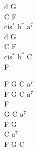 \begin{chord}
    d G\\
    C F\\
    $\mathrm{cis^*}$ $\mathrm{h^*}$ $\mathrm{a^7}$\\
    d G\\
    C F\\
    $\mathrm{cis^*}$ $\mathrm{h^*}$ C\\
    F

    F G C $\mathrm{a^7}$\\
    F G C $\mathrm{a^7}$\\
    F\\
    G C $\mathrm{a^7}$\\
    F G\\
    C $\mathrm{a^7}$\\
    F G C
\end{chord}
